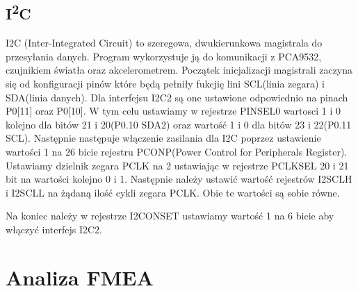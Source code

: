 \documentclass{classrep}
\begin{document}
\subsection{I\textsuperscript{2}C}
I2C (Inter-Integrated Circuit) to szeregowa, dwukierunkowa magistrala do przesyłania danych. Program wykorzystuje ją do komunikacji z PCA9532, czujnikiem światła oraz 					akcelerometrem.
\indent Początek inicjalizacji magistrali zaczyna się od konfiguracji pinów które będą pełniły fukcjię lini SCL(linia zegara) i SDA(linia danych). Dla interfejsu I2C2 są one ustawione 				odpowiednio na pinach P0[11] oraz P0[10]. W tym celu ustawiamy w rejestrze PINSEL0 wartosci 1 i 0 kolejno dla bitów 21 i 20(P0.10 SDA2) oraz wartość 1 i 0 dla bitów 23 i 22(P0.11 		SCL). Następnie następuje włączenie zasilania dla I2C poprzez ustawienie wartości 1 na 26 bicie rejestru PCONP(Power Control for Peripherals Register). Ustawiamy dzielnik zegara 			PCLK na 2 ustawiając w rejestrze PCLKSEL 20 i 21 bit na wartości kolejno 0 i 1. Następnie należy ustawić wartość rejestrów I2SCLH i I2SCLL na żądaną ilość cykli zegara PCLK. Obie			 	te wartości są sobie równe.


Na koniec należy w rejestrze I2CONSET ustawiamy wartość 1 na 6 bicie aby włączyć interfejs I2C2. 
\subsection{}
	\section{Analiza FMEA}
	



\begin{thebibliography}{abcd}

\end{thebibliography}
\end{document}
